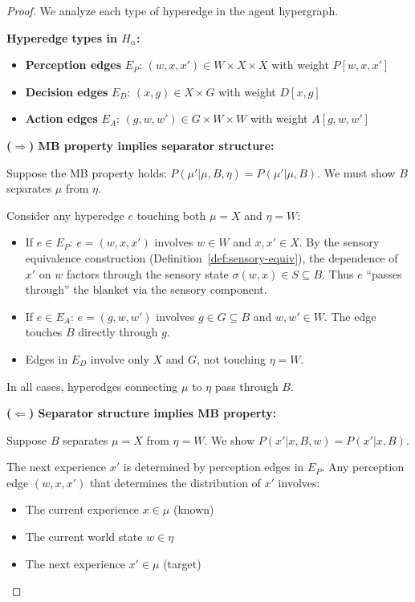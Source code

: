 \documentclass[11pt,a4paper]{article}
\theoremstyle{definition}
\theoremstyle{plain}
\theoremstyle{remark}
\begin{document}
\begin{proof}
We analyze each type of hyperedge in the agent hypergraph.

\textbf{Hyperedge types in $H_\alpha$:}
\begin{itemize}
    \item \textbf{Perception edges} $E_P$: $(w, x, x') \in W \times X \times X$ with weight $P[w, x, x']$
    \item \textbf{Decision edges} $E_D$: $(x, g) \in X \times G$ with weight $D[x, g]$
    \item \textbf{Action edges} $E_A$: $(g, w, w') \in G \times W \times W$ with weight $A[g, w, w']$
\end{itemize}

\textbf{($\Rightarrow$) MB property implies separator structure:}

Suppose the MB property holds: $P(\mu' | \mu, B, \eta) = P(\mu' | \mu, B)$. We must show $B$ separates $\mu$ from $\eta$.

Consider any hyperedge $e$ touching both $\mu = X$ and $\eta = W$:
\begin{itemize}
    \item If $e \in E_P$: $e = (w, x, x')$ involves $w \in W$ and $x, x' \in X$. By the sensory equivalence construction (Definition~\ref{def:sensory-equiv}), the dependence of $x'$ on $w$ factors through the sensory state $\sigma(w, x) \in S \subseteq B$. Thus $e$ ``passes through'' the blanket via the sensory component.
    \item If $e \in E_A$: $e = (g, w, w')$ involves $g \in G \subseteq B$ and $w, w' \in W$. The edge touches $B$ directly through $g$.
    \item Edges in $E_D$ involve only $X$ and $G$, not touching $\eta = W$.
\end{itemize}
In all cases, hyperedges connecting $\mu$ to $\eta$ pass through $B$.

\textbf{($\Leftarrow$) Separator structure implies MB property:}

Suppose $B$ separates $\mu = X$ from $\eta = W$. We show $P(x' | x, B, w) = P(x' | x, B)$.

The next experience $x'$ is determined by perception edges in $E_P$. Any perception edge $(w, x, x')$ that determines the distribution of $x'$ involves:
\begin{itemize}
    \item The current experience $x \in \mu$ (known)
    \item The current world state $w \in \eta$
    \item The next experience $x' \in \mu$ (target)
\end{itemize}


\end{proof}
\end{document}
